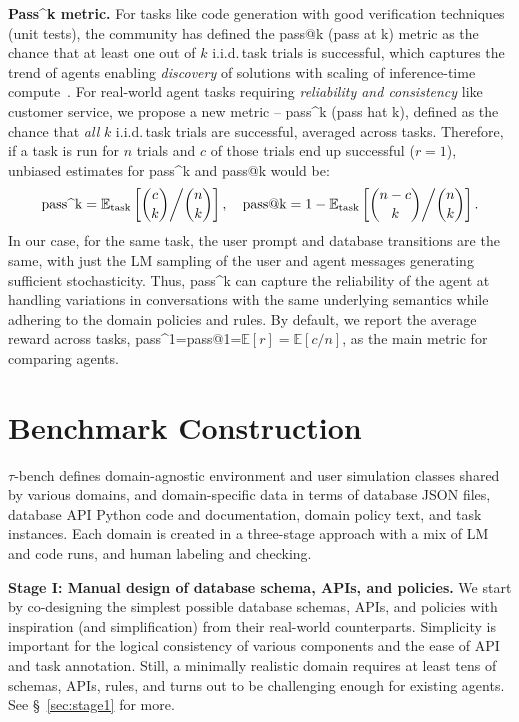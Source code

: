 \documentclass{article}
\newcommand{\benchmark}{$\tau$-bench}
\begin{document}
\textbf{Pass\textasciicircum k metric.} For tasks like code generation with good verification techniques (unit tests), the community has defined the pass@k (pass at k) metric as the chance that at least one out of $k$ i.i.d.\,task trials is successful, which captures the trend of agents enabling \emph{discovery} of solutions with scaling of inference-time compute~\citep{chen2021evaluating}. For real-world agent tasks requiring \textit{reliability and consistency} like customer service, we propose a new metric -- pass\textasciicircum k (pass hat k), defined as the chance that \textit{all} $k$ i.i.d.\,task trials are successful, averaged across tasks. Therefore, if a task is run for $n$ trials and  $c$ of those trials end up successful ($r=1$), unbiased estimates for pass\textasciicircum k and pass@k would be: 
\begin{equation*}
    \text{pass\textasciicircum k} = \mathbb{E}_{\text{task}}\left[ \binom{c}{k} \middle/ \binom{n}{k} \right], \quad \text{pass@k} = 1 - \mathbb{E}_{\text{task}}\left[ \binom{n-c}{k} \middle/  \binom{n}{k}\right].
\end{equation*}
In our case, for the same task, the user prompt and database transitions are the same, with just the LM sampling of the user and agent messages generating sufficient stochasticity. Thus, pass\textasciicircum k can capture the reliability of the agent at handling variations in conversations with the same underlying semantics while adhering to the domain policies and rules. By default, we report the average reward across tasks, pass\textasciicircum 1=pass@1=$\mathbb{E}[r]=\mathbb{E}[c / n]$, as the main metric for comparing agents.


\section{Benchmark Construction}

\benchmark{} defines domain-agnostic environment and user simulation classes shared by various domains, and domain-specific data in terms of database JSON files, database API Python code and documentation, domain policy text, and task instances. Each domain is created in a three-stage approach with a mix of LM and code runs, and human labeling and checking. 

\textbf{Stage I:  Manual design of database schema, APIs, and policies.} We start by co-designing the simplest possible database schemas, APIs, and policies with inspiration (and simplification) from their real-world counterparts. Simplicity is important for the logical consistency of various components and the ease of API and task annotation. Still, a minimally realistic domain requires at least tens of schemas, APIs, rules, and turns out to be challenging enough for existing agents. See \S~\ref{sec:stage1} for more.
\end{document}

